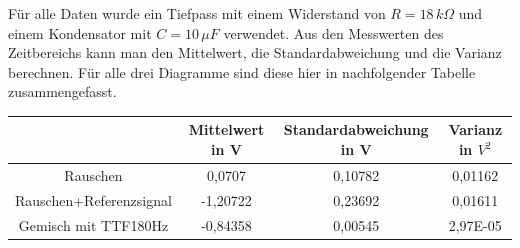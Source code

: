\documentclass{scrartcl}						%
\begin{document}
\begin{itemize}
\begin{figure}[h!]
				\end{figure}
			\end{itemize}
			\clearpage
			Für alle Daten wurde ein Tiefpass mit einem Widerstand von $ R=18\,k\Omega $ und einem Kondensator mit $ C=10\, \mu F $ verwendet.
			Aus den Messwerten des Zeitbereichs kann man den Mittelwert, die Standardabweichung und die Varianz berechnen.  Für alle drei Diagramme sind diese hier in nachfolgender Tabelle zusammengefasst.
			\center 
			\begin{tabular}{|c|c|c|c|}
			\hline  & Mittelwert in V & Standardabweichung in V & Varianz in $V^{2}$ \\ 
			\hline Rauschen & 0,0707 & 0,10782 & 0,01162 \\ 
			\hline Rauschen+Referenzsignal & -1,20722 & 0,23692 & 0,01611 \\ 
			\hline Gemisch mit TTF180Hz & -0,84358 & 0,00545 & 2,97E-05 \\ 
			\hline 
			\end{tabular} 
\end{document}
